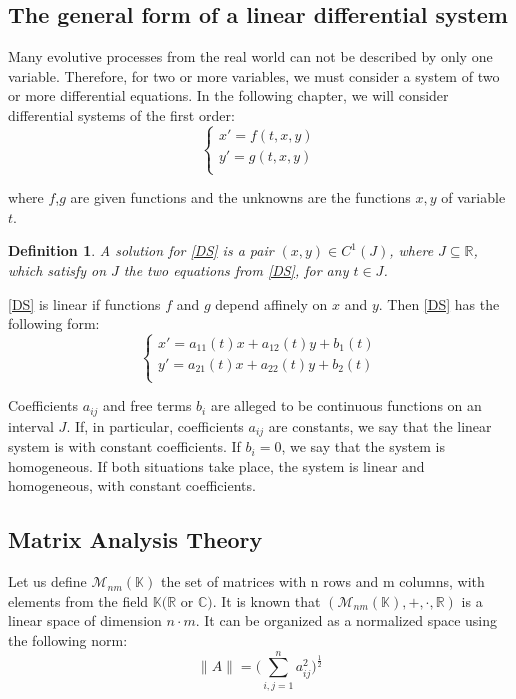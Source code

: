 \documentclass[a4paper,11pt]{report}
\newtheorem{definition}{Definition}[subsection]
\newcommand{\R}{\mathbb{R}}
\begin{document}
\subsection{The general form of a linear differential system}
Many evolutive processes from the real world can not be described by only one variable. Therefore, for two or more variables, we must consider a system 
of two or more differential equations. In the following chapter, we will consider differential systems of the first order:
\begin{equation}
\begin{cases}
 x'=f(t,x,y)\\ 
 y'=g(t,x,y)\\
\end{cases}
 \label{DS}\tag{DS}
\end{equation}

where $f$,$g$ are given functions and the unknowns are the functions $x,y$ of variable $t$. \\

\begin{definition} 
A solution for \eqref{DS} is a pair $(x,y)\in C^{1}(J)$, where $J\subseteq \R$, which satisfy on $J$ the two equations from \eqref{DS}, for 
any $t\in J$. 
\end{definition}
 
\eqref{DS} is linear if functions $f$ and $g$ depend affinely on $x$ and $y$. Then \eqref{DS} has the following form:
\begin{equation}
 \begin{cases}
  x'=a_{11}(t)x+a_{12}(t)y+b_{1}(t)\\
  y'=a_{21}(t)x+a_{22}(t)y+b_{2}(t)\\
 \end{cases}
\label{DS*}\tag{DS*}
\end{equation}

Coefficients $a_{ij}$ and free terms $b_{i}$ are alleged to be continuous functions on an interval $J$. If, in particular, coefficients $a_{ij}$
are constants, we say that the linear system is with constant coefficients. If $b_{i}=0$, we say that the system is homogeneous. If both situations
take place, the system is linear and homogeneous, with constant coefficients.

\subsection{Matrix Analysis Theory}

Let us define $\mathcal{M}_{nm}(\mathbb{K})$ the set of matrices with n rows and m columns, with elements from the field $\mathbb{K} (\R$ or $\mathbb{C})$. It is known that $(\mathcal{M}_{nm}(\mathbb{K}), +, \cdot, \R)$ is a linear space of dimension $n\cdot m$. It can be organized as a normalized space using the following norm:
\begin{equation*}
 \rVert A \rVert = \bigg( \sum_{i,j=1}^{n} a_{ij}^{2} \bigg)^\frac{1}{2}
\end{equation*}
\end{document}
